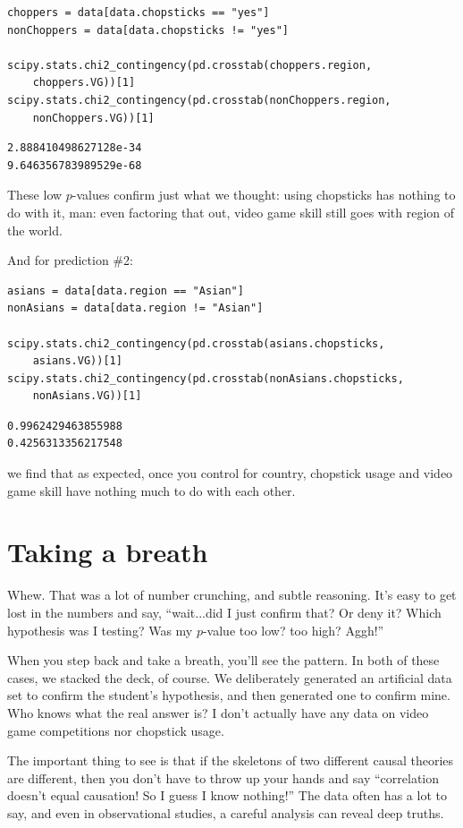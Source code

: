 \begin{Verbatim}[fontsize=\footnotesize,samepage=true,frame=single,framesep=3mm]
choppers = data[data.chopsticks == "yes"]
nonChoppers = data[data.chopsticks != "yes"]

scipy.stats.chi2_contingency(pd.crosstab(choppers.region,
    choppers.VG))[1]
scipy.stats.chi2_contingency(pd.crosstab(nonChoppers.region,
    nonChoppers.VG))[1]
\end{Verbatim}
\vspace{-.2in}

\begin{Verbatim}[fontsize=\small,samepage=true,frame=leftline,framesep=5mm,framerule=1mm]
2.888410498627128e-34
9.646356783989529e-68
\end{Verbatim}

These low $p$-values confirm just what we thought: using chopsticks has nothing
to do with it, man: even factoring that out, video game skill still goes with
region of the world.

\medskip
And for prediction \#2:

\begin{Verbatim}[fontsize=\footnotesize,samepage=true,frame=single,framesep=3mm]
asians = data[data.region == "Asian"]
nonAsians = data[data.region != "Asian"]

scipy.stats.chi2_contingency(pd.crosstab(asians.chopsticks,
    asians.VG))[1]
scipy.stats.chi2_contingency(pd.crosstab(nonAsians.chopsticks,
    nonAsians.VG))[1]
\end{Verbatim}
\vspace{-.2in}

\begin{Verbatim}[fontsize=\small,samepage=true,frame=leftline,framesep=5mm,framerule=1mm]
0.9962429463855988
0.4256313356217548
\end{Verbatim}

we find that as expected, once you control for country, chopstick usage and
video game skill have nothing much to do with each other.

\section{Taking a breath}

Whew. That was a lot of number crunching, and subtle reasoning. It's easy to
get lost in the numbers and say, ``wait...did I just confirm that? Or deny it?
Which hypothesis was I testing? Was my $p$-value too low? too high? Aggh!''

When you step back and take a breath, you'll see the pattern. In both of these
cases, we stacked the deck, of course. We deliberately generated an artificial
data set to confirm the student's hypothesis, and then generated one to confirm
mine. Who knows what the real answer is? I don't actually have any data on
video game competitions nor chopstick usage.

The important thing to see is that if the skeletons of two different causal
theories are different, then you don't have to throw up your hands and say
``correlation doesn't equal causation! So I guess I know nothing!'' The data
often has a lot to say, and even in observational studies, a careful analysis
can reveal deep truths.